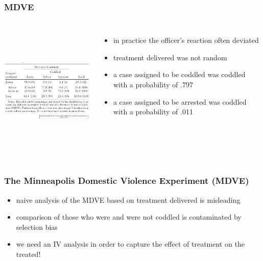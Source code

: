\documentclass{beamer}
\begin{document}
\begin{frame}
\frametitle{MDVE}
\begin{columns}
\includegraphics[width=6.5cm,height=6.5cm,keepaspectratio]{Table 3.3} 

\begin{itemize}
	\item in practice the officer's reaction often deviated
	\item treatment delivered was not random
	\item a case assigned to be coddled was coddled with a probability of .797
	\item a case assigned to be arrested was coddled with a probability of .011
\end{itemize}

\end{columns}

\end{frame}

\begin{frame}
\frametitle{The Minneapolis Domestic Violence Experiment (MDVE)}
\begin{itemize}
\item naive analysis of the MDVE based on treatment delivered is misleading
\item comparison of those who were and were not coddled is contaminated by selection bias
\item we need an IV analysis in order to capture the effect of treatment on the treated!
\end{itemize}

\end{frame}
\end{document}
